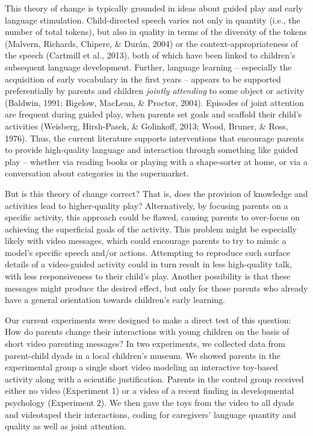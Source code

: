 \documentclass[man,floatsintext]{apa6}
\begin{document}
This theory of change is typically grounded in ideas about guided play and early language stimulation.
Child-directed speech varies not only in quantity (i.e., the number of total tokens), but also in quality in terms of the diversity of the tokens (Malvern, Richards, Chipere, \& Durán, 2004) or the context-appropriateness of the speech (Cartmill et al., 2013), both of which have been linked to children's subsequent language development.
Further, language learning -- especially the acquisition of early vocabulary in the first years -- appears to be supported preferentially by parents and children \emph{jointly attending} to some object or activity (Baldwin, 1991; Bigelow, MacLean, \& Proctor, 2004).
Episodes of joint attention are frequent during guided play, when parents set goals and scaffold their child's activities (Weisberg, Hirsh-Pasek, \& Golinkoff, 2013; Wood, Bruner, \& Ross, 1976).
Thus, the current literature supports interventions that encourage parents to provide high-quality language and interaction through something like guided play -- whether via reading books or playing with a shape-sorter at home, or via a conversation about categories in the supermarket.

But is this theory of change correct? That is, does the provision of knowledge and activities lead to higher-quality play?
Alternatively, by focusing parents on a specific activity, this approach could be flawed, causing parents to over-focus on achieving the superficial goals of the activity.
This problem might be especially likely with video messages, which could encourage parents to try to mimic a model's specific speech and/or actions.
Attempting to reproduce such surface details of a video-guided activity could in turn result in less high-quality talk, with less responsiveness to their child's play.
Another possibility is that these messages might produce the desired effect, but only for those parents who already have a general orientation towards children's early learning.

Our current experiments were designed to make a direct test of this question: How do parents change their interactions with young children on the basis of short video parenting messages?
In two experiments, we collected data from parent-child dyads in a local children's museum.
We showed parents in the experimental group a single short video modeling an interactive toy-based activity along with a scientific justification.
Parents in the control group received either no video (Experiment 1) or a video of a recent finding in developmental psychology (Experiment 2).
We then gave the toys from the video to all dyads and videotaped their interactions, coding for caregivers' language quantity and quality as well as joint attention.
\end{document}
